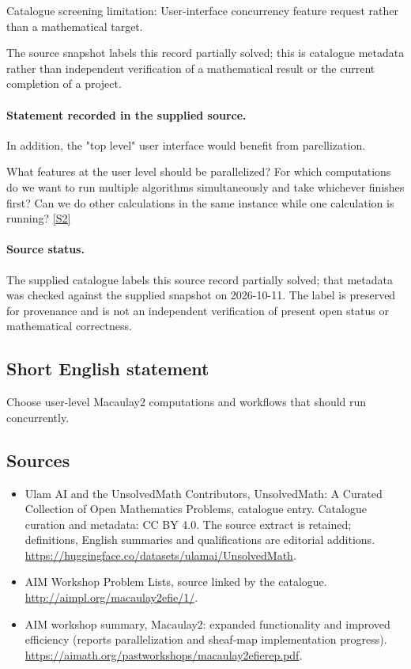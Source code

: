 \documentclass[11pt]{article}
\begin{document}
Catalogue screening limitation: User-interface concurrency feature request rather than a mathematical target.

The source snapshot labels this record partially solved; this is catalogue metadata rather than independent verification of a mathematical result or the current completion of a project.
\paragraph{Statement recorded in the supplied source.}
In addition, the "top level" user interface would benefit from parellization.

What features at the user level should be parallelized? For which computations do we want to run multiple algorithms simultaneously and take whichever finishes first? Can we do other calculations in the same instance while one calculation is running? \href{http://aimpl.org/macaulay2efie/1/}{[S2]}
\paragraph{Source status.}
The supplied catalogue labels this source record partially solved; that metadata was checked against the supplied snapshot on 2026-10-11. The label is preserved for provenance and is not an independent verification of present open status or mathematical correctness.
\subsection{Short English statement}
Choose user-level Macaulay2 computations and workflows that should run concurrently.
\subsection{Sources}
\begin{itemize}
\item[S1] Ulam AI and the UnsolvedMath Contributors, UnsolvedMath: A Curated Collection of Open Mathematics Problems, catalogue entry. Catalogue curation and metadata: CC BY 4.0. The source extract is retained; definitions, English summaries and qualifications are editorial additions.
\url{https://huggingface.co/datasets/ulamai/UnsolvedMath}.
\item[S2] AIM Workshop Problem Lists, source linked by the catalogue.
\url{http://aimpl.org/macaulay2efie/1/}.
\item[S3] AIM workshop summary, Macaulay2: expanded functionality and improved efficiency (reports parallelization and sheaf-map implementation progress).
\url{https://aimath.org/pastworkshops/macaulay2efierep.pdf}.
\end{itemize}
\end{document}
